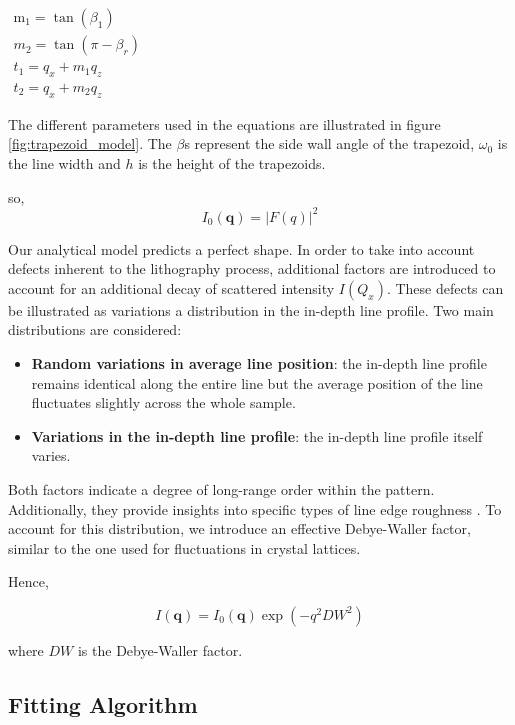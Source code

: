 \( \begin{array}{l}\mathrm{m}_{1}=\tan \left(\beta_{1}\right) \\ m_{2}=\tan \left(\pi-\beta_{r}\right) \\ t_{1}= q_{x}+m_{1} q_{z} \\ t_{2}= q_{x}+m_{2} q_{z}\end{array} \)

The different parameters used in the equations are illustrated in figure \ref{fig:trapezoid_model}.
The $\beta$s represent the side wall angle of the trapezoid, $\omega_{0}$ is the line width and $h$ is the 
height of the trapezoids. 

\medskip

so,
\begin{equation}
    I_{0}(\mathbf{q}) = |F(q)|^{2}
\end{equation}

Our analytical model predicts a perfect shape. In order to take into account defects inherent to the lithography process, 
additional factors are introduced to account for an additional decay of scattered intensity $I(Q_{x})$.
These defects can be illustrated as variations a distribution in the in-depth line profile. 
Two main distributions are considered:
\begin{itemize}
    \item \textbf{Random variations in average line position}: the in-depth line profile remains identical along the entire line
         but the average position of the line fluctuates slightly across the whole sample.
    \item \textbf{Variations in the in-depth line profile}: the in-depth line profile itself varies.
\end{itemize}

Both factors indicate a degree of long-range order within the pattern. Additionally, they provide insights into specific types of line edge roughness \cite{these_reche}.
To account for this distribution, we introduce an effective Debye-Waller factor, similar to the one used for fluctuations in crystal lattices.

Hence,

\begin{equation}
    I(\mathbf{q}) = I_{0}(\mathbf{q}) \exp(-q^{2}DW^{2} )
\end{equation}

where $DW$ is the Debye-Waller factor.

\subsection{Fitting Algorithm}

